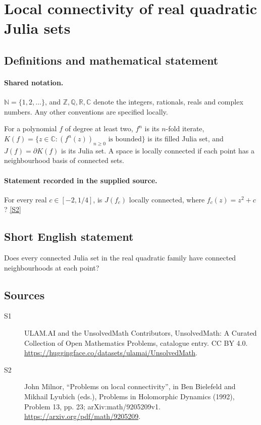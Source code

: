 \documentclass[11pt]{article}
\newcommand{\sref}[2]{\hyperlink{source:#1:#2}{[S#2]}}
\begin{document}
\section{Local connectivity of real quadratic Julia sets}\label{statement}

\subsection{Definitions and mathematical statement}

\paragraph{Shared notation.}$\mathbb N=\{1,2,\ldots\}$, and $\mathbb Z,\mathbb Q,\mathbb R,\mathbb C$ denote the integers, rationals, reals and complex numbers. Any other conventions are specified locally.


For a polynomial $f$ of degree at least two, $f^n$ is its $n$-fold iterate, $K(f)=\{z\in\mathbb C:(f^n(z))_{n\geq0}\text{ is bounded}\}$ is its filled Julia set, and $J(f)=\partial K(f)$ is its Julia set. A space is locally connected if each point has a neighbourhood basis of connected sets.
\paragraph{Statement recorded in the supplied source.}
For every real $c\in[-2,1/4]$, is $J(f_c)$ locally connected, where $f_c(z)=z^2+c$? \sref{statement}{2}
\subsection{Short English statement}
Does every connected Julia set in the real quadratic family have connected neighbourhoods at each point?
\subsection{Sources}
\begin{description}
\item[\hypertarget{source:statement:1}{S1}] ULAM.AI and the UnsolvedMath Contributors, UnsolvedMath: A Curated Collection of Open Mathematics Problems, catalogue entry. CC BY 4.0. \url{https://huggingface.co/datasets/ulamai/UnsolvedMath}.
\item[\hypertarget{source:statement:2}{S2}] John Milnor, ``Problems on local connectivity'', in Ben Bielefeld and Mikhail Lyubich (eds.), Problems in Holomorphic Dynamics (1992), Problem 13, pp. 23; arXiv:math/9205209v1. \url{https://arxiv.org/pdf/math/9205209}.
\end{description}
\label{end:statement}
\end{document}
